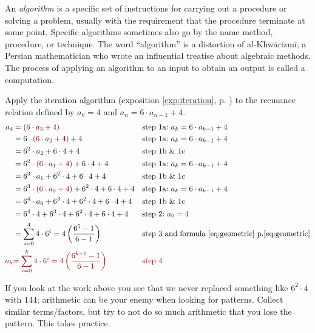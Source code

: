 \begin{defn}[Algorithm]
    An \emph{algorithm} is a specific set of instructions for carrying out a procedure or solving a problem, usually with the requirement that the procedure terminate at some point. Specific algorithms sometimes also go by the name method, procedure, or technique. The word ``algorithm'' is a distortion of al-Khw\=arizm\=i, a Persian mathematician who wrote an influential treatise about algebraic methods. The process of applying an algorithm to an input to obtain an output is called a computation. \cite{mathworldalg}
\end{defn}


\begin{exposition}
Apply the iteration algorithm (exposition \ref{exp:iteration}, p. \pageref{exp:iteration}) to the recusance relation defined by \(a_0=4\) and \(a_n=6\cdot a_{n-1} +4\).
\addtolength{\jot}{20pt}
    \begin{align*}
        a_4 &= \textcolor{secondaryaccent}{(6\cdot a_3 +4)} && \text{step 1a:}\ a_k=6\cdot a_{k-1}+4\\
            &= 6\cdot \textcolor{secondaryaccent}{(6\cdot a_2+4)} +4 && \text{step 1a:}\ a_k=6\cdot a_{k-1}+4\\
            &= 6^2\cdot a_2 +6\cdot 4 +4 && \text{step 1b \& 1c}\\
            &= 6^2\cdot \textcolor{secondaryaccent}{(6\cdot a_1+4)} +6\cdot 4 +4 && \text{step 1a:}\ a_k=6\cdot a_{k-1}+4\\
            &= 6^3\cdot a_1+ 6^2\cdot 4 +6\cdot 4 +4&& \text{step 1b \& 1c}\\
            &= 6^3\cdot \textcolor{secondaryaccent}{(6\cdot a_0+4)}+6^2\cdot 4 +6\cdot 4 +4 && \text{step 1a:}\ a_k=6\cdot a_{k-1}+4\\
            &= 6^4\cdot a_0 +6^3\cdot 4+ 6^2\cdot 4 +6\cdot 4 +4&& \text{step 1b \& 1c}\\
            &= 6^4\cdot \textcolor{secondaryaccent}{4} +6^3\cdot 4+ 6^2\cdot 4 +6\cdot 4 +4 && \text{step 2:}\ \textcolor{secondaryaccent}{a_0=4}\\
            &=\sum_{i=0}^4 4\cdot 6^i = 4\left(\frac{6^5-1}{6-1}\right) && \text{step 3 and formula \ref{eq:geometric} p.\pageref{eq:geometric}}\\
        \textcolor{secondaryaccent}{a_k} 
            &\textcolor{secondaryaccent}{=\sum_{i=0}^k 4\cdot 6^i = 4\left(\frac{6^{k+1}-1}{6-1}\right)} && \textcolor{secondaryaccent}{\text{step 4}}
    \end{align*}
\begin{note*}
    If you look at the work above you see that we never replaced something like \(6^2\cdot 4\) with \(144\); arithmetic can be your enemy when looking for patterns.  Collect similar terms/factors, but try to not do so much arithmetic that you lose the pattern.  This takes practice.
\end{note*}
\end{exposition}


